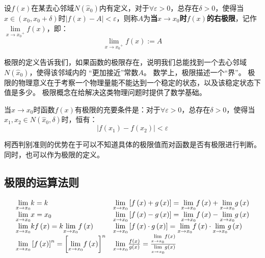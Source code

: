 \begin{definition}[右极限]
设$f\left( x \right) $在某去心邻域$N\left( \hat{x}_0 \right) $内有定义，对于$\forall \varepsilon >0$，总存在$\delta >0$，使得当$x\in \left( x_0,x_0+\delta \right) $时$\left| f\left( x \right) -A \right|<\varepsilon $，则称$A$为{\bf 当$x\rightarrow x_0$时$f\left( x \right) $的右极限}，记作$\underset{x\rightarrow {x_0}^+}{\lim}f\left( x \right) $，即：
\[
\underset{x\rightarrow {x_0}^+}{\lim}f\left( x \right) :=A
\]
\end{definition}

极限的定义告诉我们，如果函数的极限存在，说明我们总能找到一个去心邻域$N\left( \hat{x}_0 \right) $，使得该邻域内的 “更加接近”常数$A$。
数学上，极限描述一个“界”。
极限的物理意义在于考察一个物理量能不能达到一个稳定的状态，以及该稳定状态下值是多少。
极限概念在给解决这类物理问题时提供了数学基础。

\begin{theorem}[柯西判别准则]
当$x\rightarrow x_0$时函数$f\left( x \right) $有极限的充要条件是：对于$\forall \varepsilon >0$，总存在$\delta >0$，使得当$x_1,x_2\in N\left( \hat{x}_0,\delta \right) $时，恒有：
\[
\left| f\left( x_1 \right) -f\left( x_2 \right) \right|<\varepsilon
\]
\end{theorem}

柯西判别准则的优势在于可以不知道具体的极限值而对函数是否有极限进行判断。
同时，也可以作为极限的定义。

\subsection{极限的运算法则}

\begin{align*}
\begin{matrix}
	\underset{x\rightarrow x_0}{\lim}k=k \hfill & \underset{x\rightarrow x_0}{\lim}\left[ f\left( x \right) +g\left( x \right) \right] =\underset{x\rightarrow x_0}{\lim}f\left( x \right) +\underset{x\rightarrow x_0}{\lim}g\left( x \right) \hfill \\
	\underset{x\rightarrow x_0}{\lim}x=x_0 \hfill & \underset{x\rightarrow x_0}{\lim}\left[ f\left( x \right) -g\left( x \right) \right] =\underset{x\rightarrow x_0}{\lim}f\left( x \right) -\underset{x\rightarrow x_0}{\lim}g\left( x \right) \hfill \\
	\underset{x\rightarrow x_0}{\lim}kf\left( x \right) =k\underset{x\rightarrow x_0}{\lim}f\left( x \right) \hfill & \underset{x\rightarrow x_0}{\lim}\left[ f\left( x \right) \cdot g\left( x \right) \right] =\underset{x\rightarrow x_0}{\lim}f\left( x \right) \cdot \underset{x\rightarrow x_0}{\lim}g\left( x \right) \hfill \\
	\underset{x\rightarrow x_0}{\lim}\left[ f\left( x \right) \right] ^n=\left[ \underset{x\rightarrow x_0}{\lim}f\left( x \right) \right] ^n \hfill & \underset{x\rightarrow x_0}{\lim}\frac{f\left( x \right)}{g\left( x \right)}=\frac{\underset{x\rightarrow x_0}{\lim}f\left( x \right)}{\underset{x\rightarrow x_0}{\lim}g\left( x \right)} \hfill \\
\end{matrix}
\end{align*}

